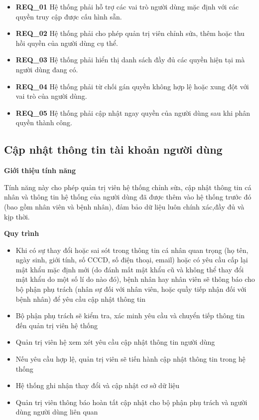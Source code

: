 \begin{itemize} 
    \item \textbf{REQ\_01} Hệ thống phải hỗ trợ các vai trò người dùng mặc định với các quyền truy cập được cấu hình sẵn.

    \item \textbf{REQ\_02} Hệ thống phải cho phép quản trị viên chỉnh sửa, thêm hoặc thu hồi quyền của người dùng cụ thể.

    \item \textbf{REQ\_03} Hệ thống phải hiển thị danh sách đầy đủ các quyền hiện tại mà người dùng đang có.

    \item \textbf{REQ\_04} Hệ thống phải từ chối gán quyền không hợp lệ hoặc xung đột với vai trò của người dùng.

    \item \textbf{REQ\_05} Hệ thống phải cập nhật ngay quyền của người dùng sau khi phân quyền thành công.
\end{itemize}

\subsection{Cập nhật thông tin tài khoản người dùng}

\noindent \textbf{Giới thiệu tính năng}

Tính năng này cho phép quản trị viên hệ thống chỉnh sửa, cập nhật thông tin cá nhân và thông tin hệ thống của người dùng đã được thêm vào hệ thống trước đó (bao gồm nhân viên và bệnh nhân), đảm bảo dữ liệu luôn chính xác,đầy đủ và kịp thời.

\noindent \textbf{Quy trình}

\begin{itemize} 
    \item Khi có sự thay đổi hoặc sai sót trong thông tin cá nhân quan trọng (họ tên, ngày sinh, giới tính, số CCCD, số điện thoại, email) hoặc có yêu cầu cấp lại mật khẩu mặc định mới (do đánh mất mật khẩu cũ và không thể thay đổi mật khẩu do một số lí do nào đó), bệnh nhân hay nhân viên sẽ thông báo cho bộ phận phụ trách (nhân sự đối với nhân viên, hoặc quầy tiếp nhận đối với bệnh nhân) để yêu cầu cập nhật thông tin  
    \item Bộ phận phụ trách sẽ kiểm tra, xác minh yêu cầu và chuyển tiếp thông tin đến quản trị viên hệ thống 
    \item Quản trị viên hệ xem xét yêu cầu cập nhật thông tin người dùng 
    \item Nếu yêu cầu hợp lệ, quản trị viên sẽ tiến hành cập nhật thông tin trong hệ thống
    \item Hệ thống ghi nhận thay đổi và cập nhật cơ sở dữ liệu 
    \item Quản trị viên thông báo hoàn tất cập nhật cho bộ phận phụ trách và người dùng người dùng liên quan
\end{itemize}

